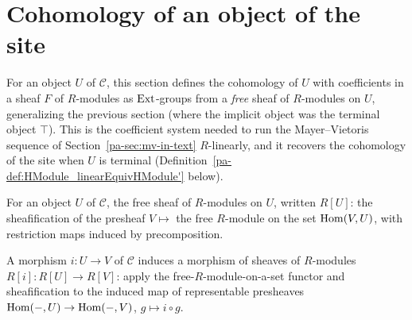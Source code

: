 \section{Cohomology of an object of the site}

For an object \(U\) of \(\mathcal C\), this section defines the cohomology of \(U\) with
coefficients in a sheaf \(F\) of \(R\)-modules as \(\operatorname{Ext}\)-groups from a \emph{free} sheaf
of \(R\)-modules on \(U\), generalizing the previous section (where the implicit object was
the terminal object \(\top\)). This is the coefficient system needed to run the
Mayer--Vietoris sequence of Section~\ref{pa-sec:mv-in-text} \(R\)-linearly, and it recovers the
cohomology of the site when \(U\) is terminal (Definition~\ref{pa-def:HModule_linearEquivHModule'}
below).

\begin{definition}
  \label{pa-def:freeModuleSheaf}
  \leanok

  For an object \(U\) of \(\mathcal C\), the free sheaf of \(R\)-modules on \(U\), written
  \(R[U]\): the sheafification of the presheaf \(V \mapsto\) the free \(R\)-module on the
  set \(\operatorname{Hom}(V, U)\), with restriction maps induced by precomposition.
\end{definition}

\begin{definition}
  \label{pa-def:freeModuleSheafMap}
  \leanok

  A morphism \(i : U \to V\) of \(\mathcal C\) induces a morphism of sheaves of
  \(R\)-modules \(R[i] : R[U] \to R[V]\): apply the free-\(R\)-module-on-a-set functor and
  sheafification to the induced map of representable presheaves
  \(\operatorname{Hom}(-,U) \to \operatorname{Hom}(-,V)\), \(g \mapsto i \circ g\).
\end{definition}

